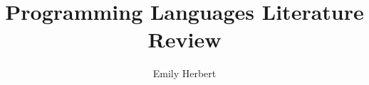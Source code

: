 \usepackage{url}
\usepackage{hyperref}
\usepackage{xcolor}

\usepackage[english]{babel}

\setcounter{topnumber}{10}
\setcounter{bottomnumber}{10}
\setcounter{totalnumber}{10}
\setcounter{dbltopnumber}{10}
\def\topfraction{1.0}
\def\bottomfraction{1.0}
\def\textfraction{0.0}
\def\dbltopfraction{1.0}

\usepackage{fancyhdr}
\pagestyle{fancy}
\lhead{}
\chead{}
\rhead{\rm\thepage}
\lfoot{}
\cfoot{}
\rfoot{}
\renewcommand{\headrulewidth}{0pt}
\renewcommand{\footrulewidth}{0pt}

\usepackage[top=2.0in,bottom=1.5in,left=1.5in,right=1.0in]{geometry}

\newcommand{\theAuthor}{Emily Herbert}
\newcommand{\theTitle}{Programming Languages Literature Review}
\newcommand{\theStartDate}{September 28, 2018}
\author{\theAuthor}
\title{\theTitle}

\newcommand{\question}[1]{\color[rgb]{1,0,0} #1 \color{saved}}